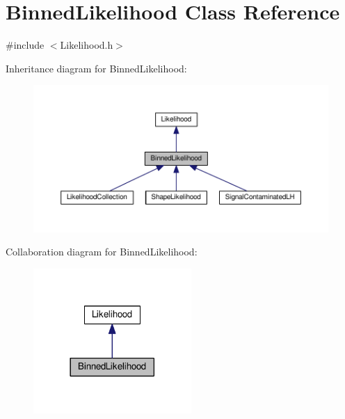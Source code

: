 \hypertarget{classBinnedLikelihood}{\section{Binned\-Likelihood Class Reference}
\label{classBinnedLikelihood}
}


{\ttfamily \#include $<$Likelihood.\-h$>$}



Inheritance diagram for Binned\-Likelihood\-:
\nopagebreak
\begin{figure}[H]
\begin{center}
\leavevmode
\includegraphics[width=350pt]{classBinnedLikelihood__inherit__graph}
\end{center}
\end{figure}


Collaboration diagram for Binned\-Likelihood\-:
\nopagebreak
\begin{figure}[H]
\begin{center}
\leavevmode
\includegraphics[width=170pt]{classBinnedLikelihood__coll__graph}
\end{center}
\end{figure}
